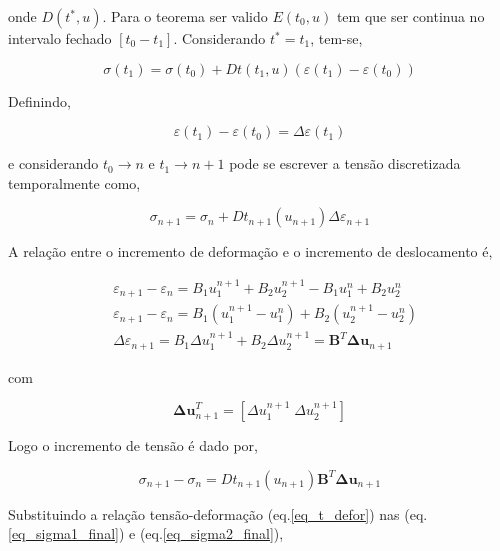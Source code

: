\documentclass[12pt,a4paper]{article}
\begin{document}
\noindent
onde $D\left(t^*,u\right)$. Para o teorema ser valido $E(t_0, u)$ tem que ser continua no intervalo fechado $[t_0-t_1]$. Considerando  $t^*=t_1$, tem-se,

\begin{equation}
\sigma\left(t_1\right) = \sigma\left(t_0\right) + Dt\left(t_1,u\right) \left(\varepsilon(t_1) - \varepsilon(t_0)\right)
\end{equation}

Definindo,

\begin{equation}
\varepsilon(t_1) - \varepsilon(t_0) = \Delta\varepsilon(t_1)
\end{equation}

\noindent
e considerando $t_0 \rightarrow  n$ e $t_1 \rightarrow  n + 1$ pode se escrever a tensão discretizada temporalmente como,

\begin{equation}
\sigma_{n + 1} = \sigma_{n} + Dt_{n+1}\left(u_{n+1}\right) \Delta\varepsilon_{n+1}
\end{equation}

A relação entre o incremento de deformação e o incremento de deslocamento é,

\begin{align}
&\varepsilon_{n+1} - \varepsilon_{n} = B_1 u_1^{n+1} + B_2 u_2^{n+1} - B_1 u_1^{n} + B_2 u_2^{n}\\
&\varepsilon_{n+1} - \varepsilon_{n} = B_1(u_1^{n+1} - u_1^{n}) + B_2 ( u_2^{n+1} - u_2^{n})\\
&\Delta \varepsilon_{n+1} = B_1 \Delta u_1^{n+1} + B_2 \Delta u_2^{n+1} = \mathbf{B}^T \mathbf{\Delta u}_{n+1}
\end{align}

\noindent
com

\begin{equation}
\mathbf{\Delta u}^T_{n+1} = [\Delta u_1^{n+1}\;\Delta u_2^{n+1}]
\end{equation}

\noindent
Logo o incremento de tensão é dado por,

\begin{equation}
\sigma_{n + 1} - \sigma_{n} = Dt_{n+1}\left(u_{n+1}\right) \mathbf{B}^T \mathbf{\Delta u}_{n+1}
\label{inc_tensao}
\end{equation}


Substituindo a relação tensão-deformação (eq.\ref{eq_t_defor}) nas  (eq.\ref{eq_sigma1_final}) e (eq.\ref{eq_sigma2_final}), 
\end{document}

